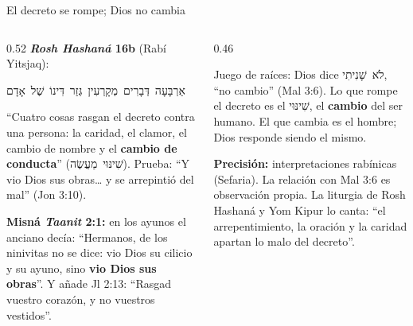 \documentclass[hyperref={bookmarks=false},aspectratio=169]{beamer}
\newcommand{\heb}[1]{\mbox{\foreignlanguage{hebrew}{#1}}}
\newcommand{\destacar}[1]{\textbf{\textcolor{azul}{#1}}}
\newcommand{\precision}[1]{{\footnotesize\color{gris}\textbf{Precisión:} #1}}
\begin{document}
\begin{frame}{El decreto se rompe; Dios no cambia}
\begin{columns}[t,onlytextwidth]
\begin{column}{0.52\textwidth}\scriptsize
\textbf{\emph{Rosh Hashaná} 16b} (Rabí Yitsjaq):\par\begin{center}\heb{אַרְבָּעָה דְּבָרִים מְקָרְעִין גְּזַר דִּינוֹ שֶׁל אָדָם}\end{center}``Cuatro cosas rasgan el decreto contra una persona: la caridad, el clamor, el cambio de nombre y el \destacar{cambio de conducta}'' (\heb{שִׁינּוּי מַעֲשֶׂה}). Prueba: ``Y vio Dios sus obras\ldots{} y se arrepintió del mal'' (Jon 3:10).\par\smallskip
\textbf{Misná \emph{Taanit} 2:1:} en los ayunos el anciano decía: ``Hermanos, de los ninivitas no se dice: vio Dios su cilicio y su ayuno, sino \destacar{vio Dios sus obras}''. Y añade Jl 2:13: ``Rasgad vuestro corazón, y no vuestros vestidos''.
\end{column}
\begin{column}{0.46\textwidth}
\begin{tcolorbox}[colback=papiro,colframe=dorado,boxrule=1.2pt,arc=3pt]
\small Juego de raíces: Dios dice \heb{לֹא שָׁנִיתִי}, ``no cambio'' (Mal 3:6). Lo que rompe el decreto es el \heb{שִׁינּוּי}, el \destacar{cambio} del ser humano. El que cambia es el hombre; Dios responde siendo el mismo.
\end{tcolorbox}
\precision{interpretaciones rabínicas (Sefaria). La relación con Mal 3:6 es observación propia. La liturgia de Rosh Hashaná y Yom Kipur lo canta: ``el arrepentimiento, la oración y la caridad apartan lo malo del decreto''.}
\end{column}
\end{columns}
\end{frame}
\end{document}
